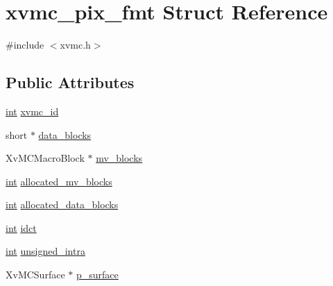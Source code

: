 \hypertarget{structxvmc__pix__fmt}{}\section{xvmc\+\_\+pix\+\_\+fmt Struct Reference}
\label{structxvmc__pix__fmt}


{\ttfamily \#include $<$xvmc.\+h$>$}

\subsection*{Public Attributes}
\begin{DoxyCompactItemize}
\item 
\hyperlink{xmltok_8h_a5a0d4a5641ce434f1d23533f2b2e6653}{int} \hyperlink{structxvmc__pix__fmt_a6cadfce3023ac1a8730e675629f21430}{xvmc\+\_\+id}
\item 
short $\ast$ \hyperlink{structxvmc__pix__fmt_a194ffdefda2917100cedd71ce3ae6877}{data\+\_\+blocks}
\item 
Xv\+M\+C\+Macro\+Block $\ast$ \hyperlink{structxvmc__pix__fmt_ad83c1ceb45842ea0d4988f4b9b9e6483}{mv\+\_\+blocks}
\item 
\hyperlink{xmltok_8h_a5a0d4a5641ce434f1d23533f2b2e6653}{int} \hyperlink{structxvmc__pix__fmt_a7cd4533356f2d7c753d706be423fc9a8}{allocated\+\_\+mv\+\_\+blocks}
\item 
\hyperlink{xmltok_8h_a5a0d4a5641ce434f1d23533f2b2e6653}{int} \hyperlink{structxvmc__pix__fmt_af3cade3f29f20d5145ec37da14919c90}{allocated\+\_\+data\+\_\+blocks}
\item 
\hyperlink{xmltok_8h_a5a0d4a5641ce434f1d23533f2b2e6653}{int} \hyperlink{structxvmc__pix__fmt_ac4b1077dca08f6e076840a8797b23d1c}{idct}
\item 
\hyperlink{xmltok_8h_a5a0d4a5641ce434f1d23533f2b2e6653}{int} \hyperlink{structxvmc__pix__fmt_a19d652ba10cd3efe9b0540fdd76cd580}{unsigned\+\_\+intra}
\item 
Xv\+M\+C\+Surface $\ast$ \hyperlink{structxvmc__pix__fmt_a027005d198ee1a18b1c7f466df8b03c5}{p\+\_\+surface}
\end{DoxyCompactItemize}
{\bf }\par

